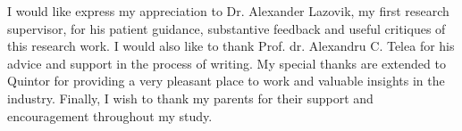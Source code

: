 
I would like express my appreciation to Dr. Alexander Lazovik, my first research supervisor, for his patient guidance, substantive feedback and useful critiques of this research work. I would also like to thank Prof. dr. Alexandru C. Telea for his advice and support in the process of writing. My special thanks are extended to Quintor for providing a very pleasant place to work and valuable insights in the industry. Finally, I wish to thank my parents for their support and encouragement throughout my study.